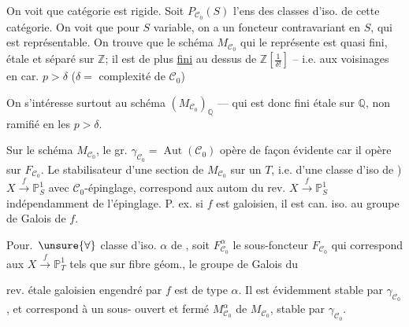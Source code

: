  On voit que  catégorie est rigide.
 Soit  $P_{\mathcal C_0}(S)$ l'ens des classes d'iso. de cette catégorie. On voit que pour $S$ variable, on a un foncteur contravariant en $S$, qui est représentable. On trouve que le schéma $M_{\mathcal C_0}$ qui le représente est quasi fini,  étale et séparé sur $\mathbb Z$; il est de plus \uline{fini} au dessus de $\mathbb Z[\frac1{\delta!}]$ -- i.e. aux voisinages en car. $p>\delta$ ($\delta=$ complexité de $\mathcal C_0$)

On s'intéresse surtout au schéma $(M_{\mathcal C_0})_{\mathbb Q}$ --- qui est donc fini étale sur $\mathbb Q$, non ramifié en les $p>\delta$.


Sur le schéma $M_{\mathcal C_0}$, le gr. $\gamma_{\mathcal C_0}=\operatorname{Aut}(\mathcal C_0)$ opère de façon évidente car il opère sur $F_{\mathcal C_0}$. Le stabilisateur d'une section de $M_{\mathcal C_0}$ sur un $T$, i.e. d'une classe d'iso de ) $X\xrightarrow{f}\mathbb P^1_S$ \unsure{\ldots} avec \deleted{$\unsure{\gamma}$} $\mathcal C_0$-épinglage, correspond  aux autom du  rev. $X\xrightarrow{f}\mathbb P^1_S$ indépendamment de l'épinglage. P. ex. si $f$ est galoisien, il est can. iso. au groupe de Galois de $f$.

Pour.\ $\unsure{\forall}$ classe d'iso. $\alpha$ de   ,   soit $F_{\mathcal C_0}^{\alpha}$ le sous-foncteur  $F_{\mathcal C_0}$ qui correspond aux $X\xrightarrow{f}\mathbb P^1_T$ tels que sur  fibre géom., le groupe de Galois du

rev. étale galoisien  engendré par $f$ est de type $\alpha$. Il est évidemment stable par $\gamma_{\mathcal C_0}$, et correspond à un sous- ouvert et fermé $M_{\mathcal C_0}^{\alpha}$ de $M_{\mathcal C_0}$, stable par $\gamma_{\mathcal C_0}$.

